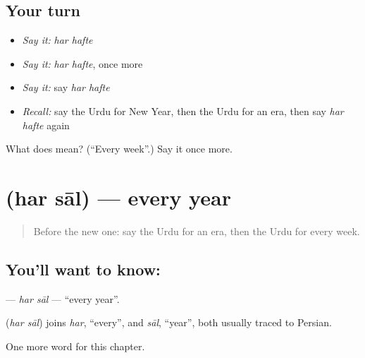 \subsection*{Your turn}
\begin{itemize}
\raggedright
  \item \emph{Say it:} \emph{har hafte}
  \item \emph{Say it:} \emph{har hafte}, once more
  \item \emph{Say it:} say \emph{har hafte}
  \item \emph{Recall:} say the Urdu for New Year, then the Urdu for an era, then say \emph{har hafte} again
\end{itemize}

\begin{tcolorbox}[breakable,colback=teal!4,colframe=teal!35!black,title={Before you move on}]
What does   mean? (\textquotedblleft{}Every week\textquotedblright{}.) Say it once more.
\end{tcolorbox}
\section[\texorpdfstring{\ur{ہر} \ur{سال} (har sāl)}{ہر سال (har sāl)}]{  (har sāl) — every year}

\label{lesson:UR-C156-har-sal}



\begin{quote}
Before the new one: say the Urdu for an era, then the Urdu for every week.
\end{quote}

\subsection*{You'll want to know:  }
\textbf{ } — \emph{har sāl} — \textquotedblleft{}every year\textquotedblright{}.

\begin{cousinweb}
\textbf{ } (\emph{har sāl}) joins \emph{har}, \textquotedblleft{}every\textquotedblright{}, and \emph{sāl}, \textquotedblleft{}year\textquotedblright{}, both usually traced to Persian.
\end{cousinweb}

\begin{grammarlens}[title={What you've built}]
One more word for this chapter.
\end{grammarlens}

